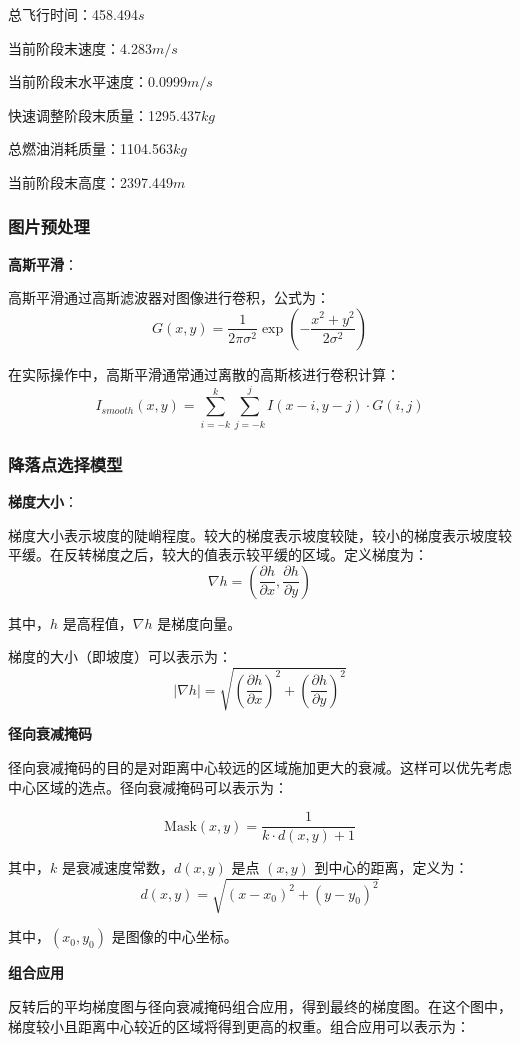 \documentclass{ctexart}
\begin{document}
总飞行时间：458.494\(s\)

当前阶段末速度：4.283\(m/s\)

当前阶段末水平速度：0.0999\(m/s\)

快速调整阶段末质量：1295.437\(kg\)

总燃油消耗质量：1104.563\(kg\)

当前阶段末高度：2397.449\(m\)

\subsubsection{图片预处理}
\textbf{高斯平滑}：

高斯平滑通过高斯滤波器对图像进行卷积，公式为：
\[
G(x, y) = \frac{1}{2\pi\sigma^2} \exp\left(-\frac{x^2 + y^2}{2\sigma^2}\right)
\]

在实际操作中，高斯平滑通常通过离散的高斯核进行卷积计算：
\[
I_{smooth}(x, y) = \sum_{i=-k}^{k} \sum_{j=-k}^{j} I(x-i, y-j) \cdot G(i, j)
\]
\subsubsection{降落点选择模型}

\textbf{梯度大小}：

梯度大小表示坡度的陡峭程度。较大的梯度表示坡度较陡，较小的梯度表示坡度较平缓。在反转梯度之后，较大的值表示较平缓的区域。定义梯度为：
\[
\nabla h = \left( \frac{\partial h}{\partial x}, \frac{\partial h}{\partial y} \right)
\]

其中，\( h \) 是高程值，\(\nabla h\) 是梯度向量。

梯度的大小（即坡度）可以表示为：
\[
|\nabla h| = \sqrt{\left( \frac{\partial h}{\partial x} \right)^2 + \left( \frac{\partial h}{\partial y} \right)^2}
\]

\textbf{径向衰减掩码}

径向衰减掩码的目的是对距离中心较远的区域施加更大的衰减。这样可以优先考虑中心区域的选点。径向衰减掩码可以表示为：

\[
\text{Mask}(x, y) = \frac{1}{k \cdot d(x, y) + 1}
\]

其中，\( k \) 是衰减速度常数，\( d(x, y) \) 是点 \((x, y)\) 到中心的距离，定义为：
\[
d(x, y) = \sqrt{(x - x_0)^2 + (y - y_0)^2}
\]

其中，\( (x_0, y_0) \) 是图像的中心坐标。

\textbf{组合应用}

反转后的平均梯度图与径向衰减掩码组合应用，得到最终的梯度图。在这个图中，梯度较小且距离中心较近的区域将得到更高的权重。组合应用可以表示为：
\end{document}
